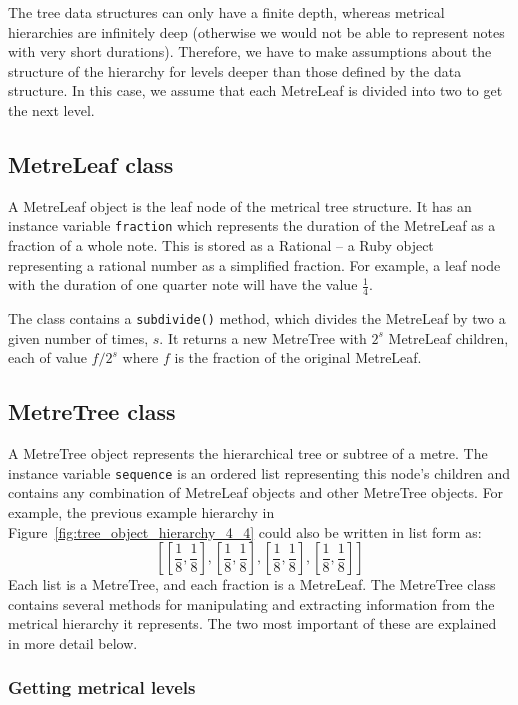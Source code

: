 \documentclass[12pt,twoside,openright]{report}
\begin{document}
The tree data structures can only have a finite depth, whereas metrical hierarchies are infinitely deep (otherwise we would not be able to represent notes with very short durations). Therefore, we have to make assumptions about the structure of the hierarchy for levels deeper than those defined by the data structure. In this case, we assume that each MetreLeaf is divided into two to get the next level.


\subsection{MetreLeaf class} \label{metreleaf}

A MetreLeaf object is the leaf node of the metrical tree structure. It has an
instance variable \verb'fraction' which represents the duration of the
MetreLeaf as a fraction of a whole note. This is stored as a Rational -- a Ruby object representing a rational number as a simplified fraction. For
example, a leaf node with the duration of one quarter note will have the value $\frac{1}{4}$.

The class contains a \verb'subdivide()' method, which divides the MetreLeaf by two a
given number of times, $s$. It returns a new MetreTree with $2^s$ MetreLeaf children, each of value $f/2^s$ where $f$ is the fraction of the original MetreLeaf.


\subsection{MetreTree class} \label{metretree}

A MetreTree object represents the hierarchical tree or subtree of a metre. The
instance variable \verb'sequence' is an ordered list representing this node's children and contains any combination of
MetreLeaf objects and other MetreTree objects. For
example, the previous example hierarchy in Figure~\ref{fig:tree_object_hierarchy_4_4} could also be written in list form as:
\[\left[\left[\frac{1}{8},\frac{1}{8}\right],\left[\frac{1}{8},\frac{1}{8}\right],\left[\frac{1}{8},\frac{1}{8}\right],\left[\frac{1}{8},\frac{1}{8}\right]\right]\]
Each list is a
MetreTree, and each fraction is a MetreLeaf. The MetreTree class contains
several methods for manipulating and extracting information from the metrical
hierarchy it represents. The two most important of these are explained in more
detail below.

\subsubsection{Getting metrical levels} \label{get_level}
\end{document}
